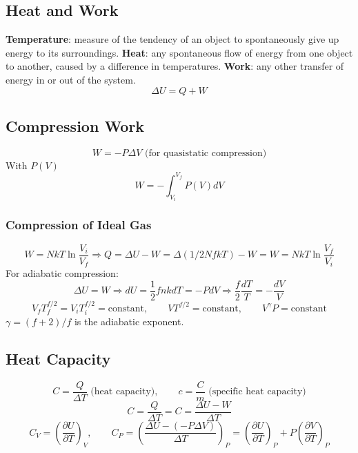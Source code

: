 \documentclass[a4paper,norsk, 10pt]{article}
\begin{document}
\subsection{Heat and Work}
\textbf{Temperature}: measure of the tendency of an object to spontaneously give up energy to its surroundings.
\textbf{Heat}: any spontaneous flow of energy from one object to another, caused by a difference in temperatures.
\textbf{Work}: any other transfer of energy in or out of the system.
\begin{equation}
\Delta U = Q + W
\end{equation}
\subsection{Compression Work}
\begin{equation}
W = -P\Delta V \text{ (for quasistatic compression)}
\end{equation}
With $P(V)$
\begin{equation}
W = -\int_{V_i}^{V_f}P(V)dV
\end{equation}
\subsubsection{Compression of Ideal Gas}
\begin{equation}
W = NkT\ln\frac{V_i}{V_f} \Rightarrow Q = \Delta U - W = \Delta (1/2 NfkT) - W = W = NkT\ln\frac{V_f}{V_i}
\end{equation}
For adiabatic compression:
\begin{equation}
\Delta U = W \Rightarrow dU = \frac{1}{2}fnkdT = -PdV \Rightarrow \frac{f}{2}\frac{dT}{T} = -\frac{dV}{V}
\end{equation}
\begin{equation}
V_f T_f^{f/2} = V_i T_i^{f/2} = \text{constant}, \qquad VT^{f/2} = \text{constant},\qquad V^\gamma P = \text{constant}
\end{equation}
$\gamma = (f+2)/f$ is the adiabatic exponent.

\subsection{Heat Capacity}
\begin{equation}
C = \frac{ Q}{\Delta T} \text{ (heat capacity)}, \qquad c = \frac{C}{m} \text{ (specific heat capacity})
\end{equation}
\begin{equation}
C = \frac{ Q}{\Delta T} = C = \frac{\Delta U - W}{\Delta T}
\end{equation}
\begin{equation}
C_V =\left( \frac{\partial U}{\partial T}\right)_V, \qquad C_P = \left(\frac{\Delta U -(-P\Delta V)}{\Delta T}\right)_P = \left( \frac{\partial U}{\partial T}\right)_P + P\left( \frac{\partial V}{\partial T}\right)_P
\end{equation}
\end{document}
